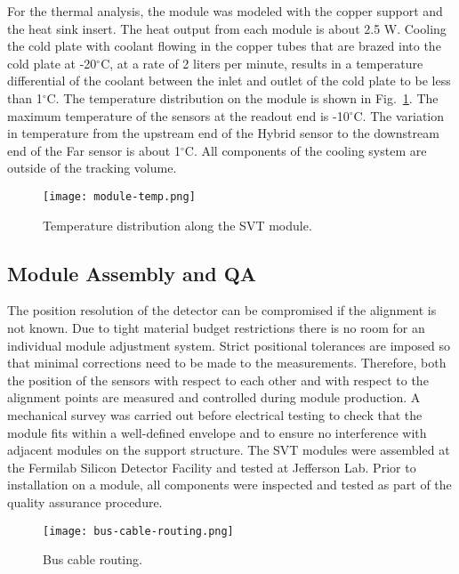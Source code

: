 For the thermal analysis, the module was modeled with the copper support and the heat sink insert. The heat output from each module is about 2.5 W. Cooling the cold plate with coolant flowing in the copper tubes that are brazed into the cold plate at -20$^\circ$C, at a rate of 2 liters per minute, results in a temperature differential of the coolant between the inlet and outlet of the cold plate to be less than 1$^\circ$C. The temperature distribution on the module is shown in Fig.~\ref{fig:module-temp}. The maximum temperature of the sensors at the readout end is -10$^\circ$C. The variation in temperature from the upstream end of the Hybrid sensor to the downstream end of the Far sensor is about 1$^\circ$C. All components of the cooling system are outside of the tracking volume.

\begin{figure}[hbt] 
\centering 
\texttt{[image: module-temp.png]}
\caption{Temperature distribution along the SVT module.}
\label{fig:module-temp}
\end{figure}

\subsection{Module Assembly and QA}

The position resolution of the detector can be compromised if the alignment is not known. Due to tight material budget restrictions there is no room for an individual module adjustment system. Strict positional tolerances are imposed so that minimal corrections need to be made to the measurements. Therefore, both the position of the sensors with respect to each other and with respect to the alignment points are measured and controlled during module production. A mechanical survey was  carried out before electrical testing to check that the module fits within a well-defined envelope and to ensure no interference with adjacent modules on the support structure. The SVT modules were assembled at the Fermilab Silicon Detector Facility and tested at Jefferson Lab. Prior to installation on a module, all components were inspected and tested as part of the quality assurance procedure.  

\begin{figure}[hbt] 
\centering 
\texttt{[image: bus-cable-routing.png]}
\caption{Bus cable routing.}
\label{fig:bus-cable-routing}
\end{figure}

